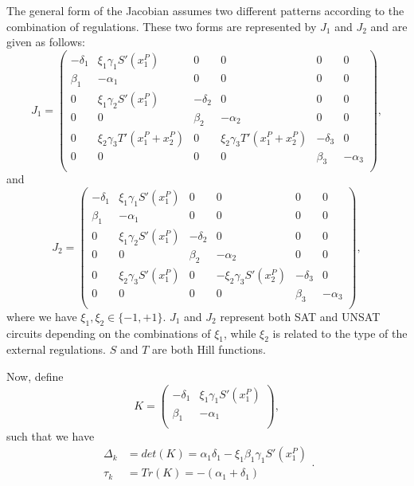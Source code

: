 The general form of the Jacobian assumes two different 
patterns according to the combination of regulations. These 
two forms are represented by $J_1$ and $J_2$ and are given 
as follows:
\begin{equation} \label{eq:jaco-special-1}
    J_1 = 
    \begin{pmatrix}
        -\delta_1 & \xi_1\gamma_1S'(x_1^P) & 0 & 0 & 0 & 0 \\
        \beta_1 & -\alpha_1 & 0 & 0 & 0 & 0 \\
        0 & \xi_1\gamma_2 S'(x_1^P) & -\delta_2 & 0 & 0 & 0 \\
        0 & 0 & \beta_2 & -\alpha_2 & 0 & 0 \\
        0 & \xi_2 \gamma_3 T'(x_1^P + x_2^P) & 0 & \xi_2 \gamma_3 T'(x_1^P + x_2^P) & -\delta_3 & 0 \\
        0 & 0 & 0 & 0 & \beta_3 & -\alpha_3 \\
    \end{pmatrix},
\end{equation}
and 
\begin{equation} \label{eq:jaco-special-2}
    J_2 = 
    \begin{pmatrix}
        -\delta_1 & \xi_1\gamma_1S'(x_1^P) & 0 & 0 & 0 & 0 \\
        \beta_1 & -\alpha_1 & 0 & 0 & 0 & 0 \\
        0 & \xi_1\gamma_2 S'(x_1^P) & -\delta_2 & 0 & 0 & 0 \\
        0 & 0 & \beta_2 & -\alpha_2 & 0 & 0 \\
        0 & \xi_2 \gamma_3 S'(x_1^P) & 0 & -\xi_2 \gamma_3 S'(x_2^P) & -\delta_3 & 0 \\
        0 & 0 & 0 & 0 & \beta_3 & -\alpha_3 \\
    \end{pmatrix},
\end{equation}
where we have $\xi_1, \xi_2 \in \{ -1, +1 \}$. $J_1$ and $J_2$ 
represent both SAT and UNSAT circuits depending on the combinations 
of $\xi_1$, while $\xi_2$ is related to the type of the external 
regulations. $S$ and $T$ are both Hill functions.

Now, define
\begin{equation}
K = 
    \begin{pmatrix}
        -\delta_1 & \xi_1\gamma_1S'(x_1^P) \\
        \beta_1 & -\alpha_1 \\
    \end{pmatrix},
\end{equation} 
such that we have
\begin{equation}
    \begin{aligned}
        \Delta_k &= det(K) = \alpha_1 \delta_1 - \xi_1 \beta_1 \gamma_1 S'(x_1^P)\\
        \tau_k &= Tr(K) = -(\alpha_1 + \delta_1)
    \end{aligned}.
\end{equation}

